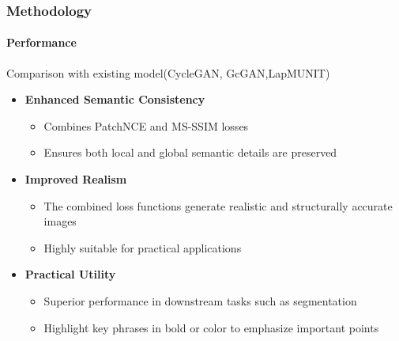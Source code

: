\documentclass[aspectratio=169, lecture, amberg]{OTHAWbeamer}
\begin{document}
\begin{frame}[t]
    \frametitle{Methodology}
    \framesubtitle{Performance}
Comparison with existing model(CycleGAN, GcGAN,LapMUNIT)
\vspace{0.2cm}
    \begin{itemize}
        \item <1-> \textbf{Enhanced Semantic Consistency}
        \vspace{0.2cm}
        \begin{itemize}
            \item Combines PatchNCE and MS-SSIM losses
            \vspace{0.2cm}
            \item Ensures both local and global semantic details are preserved
            \vspace{0.2cm}
        \end{itemize}
        \item <2-> \textbf{Improved Realism}
        \vspace{0.2cm}
        \begin{itemize}
            \item The combined loss functions generate realistic and structurally accurate images
            \vspace{0.2cm}
            \item Highly suitable for practical applications
            \vspace{0.2cm}

        \end{itemize}
        \item <3-> \textbf{Practical Utility}
        \vspace{0.2cm}
        \begin{itemize}
            \item Superior performance in downstream tasks such as segmentation
            \vspace{0.2cm}
            \item Highlight key phrases in bold or color to emphasize important points
            \vspace{0.2cm}
        \end{itemize}

    \end{itemize}
    
\end{frame}
\end{document}
